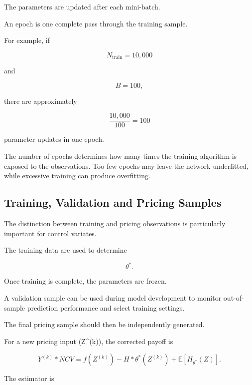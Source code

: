 \documentclass[12pt,a4paper]{report}
\begin{document}
The parameters are updated after each mini-batch.

An epoch is one complete pass through the training sample.

For example, if

\begin{equation}
N_{\mathrm{train}}
=
10{,}000
\end{equation}

and

\begin{equation}
B=100,
\end{equation}

there are approximately

\begin{equation}
\frac{10{,}000}{100}
=
100
\end{equation}

parameter updates in one epoch.

The number of epochs determines how many times the training algorithm is exposed to the observations. Too few epochs may leave the network underfitted, while excessive training can produce overfitting.

\subsection{Training, Validation and Pricing Samples}

The distinction between training and pricing observations is particularly important for control variates.

The training data are used to determine

\begin{equation}
\theta^*.
\end{equation}

Once training is complete, the parameters are frozen.

A validation sample can be used during model development to monitor out-of-sample prediction performance and select training settings.

The final pricing sample should then be independently generated.

For a new pricing input (Z^{(k)}), the corrected payoff is

\begin{equation}
Y^{(k)}*{NCV}
=
f(Z^{(k)})
-
H*{\theta^*}(Z^{(k)})
+
\mathbb{E}
\left[
H_{\theta^*}(Z)
\right].
\end{equation}

The estimator is
\end{document}
